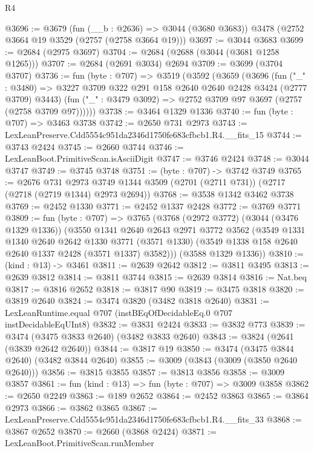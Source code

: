 \begin{lexlean}{R4}
\begin{coremodule}
@3696 := @3679
    (fun (__b : @2636) => @3044 (@3680 @3683))
    @3478
    (@2752 @3664 @19 @3529 (@2757 (@2758 @3664 @19)))
@3697 := @3044 @3683
@3699 := @2684 (@2975 @3697)
@3704 := @2684 (@2688 (@3044 (@3681 @1258 @1265)))
@3707 := @2684 (@2691 @3034) @2694
@3709 := @3699 (@3704 @3707)
@3736 := fun (byte : @707) =>
  @3519
    (@3592
      (@3659
        (@3696
          (fun ("_" : @3480) =>
          @3227 @3709 @322 @291 @158 @2640 @2640 @2428 @3424 (@2777 @3709) @3443)
          (fun ("_" : @3479 @3092) => @2752 @3709 @97 @3697 (@2757 (@2758 @3709 @97))))))
@3738 := @3464 @1329 @1336
@3740 := fun (byte : @707) => @3463 @3738
@3742 := @2650 @731 @2973
@3743 := LexLeanPreserve.Cdd5554c951da2346d1750fe683cfbcb1.R4.__fits_15
@3744 := @3743 @2424
@3745 := @2660 @3744
@3746 := LexLeanBoot.PrimitiveScan.isAsciiDigit
@3747 := @3746 @2424
@3748 := @3044 @3747
@3749 := @3745 @3748
@3751 := (byte : @707) -> @3742 @3749
@3765 := @2676
    @731
    @2973
    @3749
    @1344
    @3509
    (@2701 (@2711 @731))
    (@2717 (@2718 (@2719 @1344) @2973 @2694))
@3768 := @3538 @1342 @3462 @3738
@3769 := @2452 @1330
@3771 := @2452 @1337 @2428
@3772 := @3769 @3771
@3809 := fun (byte : @707) =>
  @3765
    (@3768
      (@2972 @3772)
      (@3044 (@3476 @1329 @1336))
      (@3550
        @1341
        @2640
        @2643
        @2971
        @3772
        @3562
        (@3549
          @1331
          @1340
          @2640
          @2642
          @1330
          @3771
          (@3571 @1330)
          (@3549 @1338 @158 @2640 @2640 @1337 @2428 (@3571 @1337) @3582)))
      (@3588 @1329 @1336))
@3810 := (kind : @13) -> @3461
@3811 := @2639 @2642
@3812 := @3811 @3495
@3813 := @2639 @3812
@3814 := @3811 @3744
@3815 := @2639 @3814
@3816 := Nat.beq
@3817 := @3816 @2652
@3818 := @3817 @90
@3819 := @3475 @3818
@3820 := @3819 @2640
@3824 := @3474 @3820 (@3482 @3818 @2640)
@3831 := LexLeanRuntime.equal @707 (instBEqOfDecidableEq.{0} @707 instDecidableEqUInt8)
@3832 := @3831 @2424
@3833 := @3832 @773
@3839 := @3474 (@3475 @3833 @2640) (@3482 @3833 @2640)
@3843 := @3824 (@2641 (@3839 @2642 @2640))
@3844 := @3817 @19
@3850 := @3474 (@3475 @3844 @2640) (@3482 @3844 @2640)
@3855 := @3009 (@3843 (@3009 (@3850 @2640 @2640)))
@3856 := @3815 @3855
@3857 := @3813 @3856
@3858 := @3009 @3857
@3861 := fun (kind : @13) => fun (byte : @707) => @3009 @3858
@3862 := @2650 @2249
@3863 := @189 @2652
@3864 := @2452 @3863
@3865 := @3864 @2973
@3866 := @3862 @3865
@3867 := LexLeanPreserve.Cdd5554c951da2346d1750fe683cfbcb1.R4.__fits_33
@3868 := @3867 @2652
@3870 := @2660 (@3868 @2424)
@3871 := LexLeanBoot.PrimitiveScan.runMember

\end{coremodule}
\end{lexlean}

